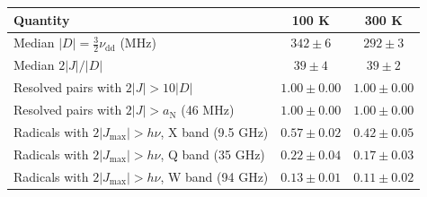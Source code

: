 \begin{tabular}{lcc}
\toprule
Quantity & 100 K & 300 K\\
\midrule
Median $|D|=\tfrac32\nu_\mathrm{dd}$ (MHz) & $342\pm6$ & $292\pm3$\\
Median $2|J|/|D|$ & $39\pm4$ & $39\pm2$\\
Resolved pairs with $2|J|>10|D|$ & $1.00\pm0.00$ & $1.00\pm0.00$\\
Resolved pairs with $2|J|>a_\mathrm{N}$ (46 MHz) & $1.00\pm0.00$ & $1.00\pm0.00$\\
Radicals with $2|J_\mathrm{max}|>h\nu$, X band (9.5 GHz) & $0.57\pm0.02$ & $0.42\pm0.05$\\
Radicals with $2|J_\mathrm{max}|>h\nu$, Q band (35 GHz) & $0.22\pm0.04$ & $0.17\pm0.03$\\
Radicals with $2|J_\mathrm{max}|>h\nu$, W band (94 GHz) & $0.13\pm0.01$ & $0.11\pm0.02$\\
\bottomrule
\end{tabular}
